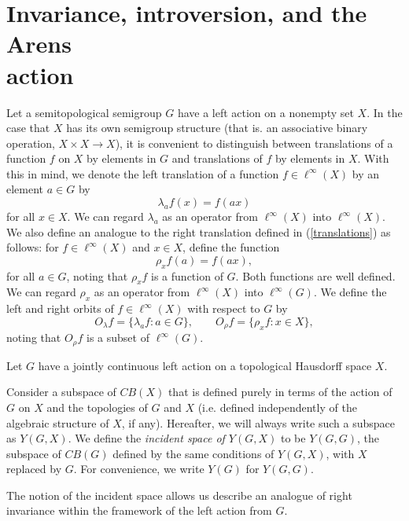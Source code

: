 \section{Invariance, introversion, and the Arens\\action}\label{main:intro}
Let a semitopological semigroup $G$ have a left action on a nonempty set $X$.  In the case that 
$X$ has its own semigroup structure
(that is. an associative binary operation, $X\times X \rightarrow X$), it is convenient to distinguish
between translations of a function $f$ on $X$ by elements in $G$ and translations of $f$ by elements in $X$.
With this in mind, 
we denote the left translation of a function $f\in \ell^\infty (X)$ by an element $a\in G$ by
\[
\lambda_a f(x) = f(ax)
\]
for all $x\in X$. We can regard $\lambda_a$ as an operator from $\ell^\infty(X)$ into $\ell^\infty(X)$.
We also define an analogue to the right translation defined
in (\ref{translations}) as follows: for $f\in \ell^\infty(X)$ and $x\in X$, define the function
\[
\rho_x f(a) = f(ax),
\]
for all $a\in G$, noting that $\rho_x f$ is a function of $G$.  Both functions are well defined.
We can regard $\rho_x$ as an operator from $\ell^\infty(X)$ into $\ell^\infty(G)$.
We define the left and right orbits of $f\in \ell^\infty(X)$ with respect to $G$ by
\[
O_\lambda f = \{ \lambda_a f: a\in G \},\qquad O_\rho f = \{ \rho_x f: x\in X \},
\]
noting that $O_\rho f$ is a subset of $\ell^\infty(G)$.

Let $G$ have a jointly continuous left action on a topological Hausdorff space $X$.

\begin{defn}
Consider a subspace of $CB(X)$ that is defined purely in terms of the action of $G$ on $X$
and the topologies of $G$ and $X$ (i.e. defined independently of the algebraic structure of $X$, if any).
Hereafter, we will always write such a subspace as $Y(G,X)$.  We define the
{\it incident space of $Y(G,X)$} to be $Y(G,G)$, the subspace
of $CB(G)$ defined by the same conditions of $Y(G,X)$, with $X$ replaced by $G$.
For convenience, we write $Y(G)$ for $Y(G,G)$.
\end{defn}

The notion of the incident space allows us describe an analogue
of right invariance within the framework of the left action from $G$.

